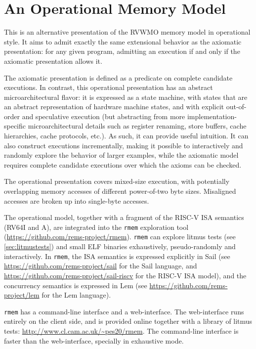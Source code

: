 \section{An Operational Memory Model}
\label{sec:operational}
This is an alternative presentation of the RVWMO memory model in
operational style.
%
It aims to admit exactly the same extensional behavior as the
axiomatic presentation: for any given program, admitting an execution
if and only if the axiomatic presentation allows it.

The axiomatic presentation is defined as a predicate on complete
candidate executions.  In contrast, this operational presentation has
an abstract microarchitectural flavor: it is expressed as a state
machine, with states that are an abstract representation of hardware
machine states, and with explicit out-of-order and speculative
execution
(but abstracting from more implementation-specific microarchitectural
details such as register renaming, store buffers, cache hierarchies, cache protocols, etc.).
As such, it can provide useful intuition.
It can also
construct executions incrementally, making it possible to
interactively and randomly explore the behavior of larger examples,
while the axiomatic model requires complete candidate executions
over which the axioms can be checked.

The operational presentation covers mixed-size execution, with
potentially overlapping memory accesses of different power-of-two byte
sizes.  Misaligned accesses are broken up into single-byte accesses.

The operational model, together with a fragment of the RISC-V ISA
semantics (RV64I and A), are integrated into the {\tt rmem} exploration
tool (\url{https://github.com/rems-project/rmem}).  {\tt rmem} can
explore litmus tests (see \ref{sec:litmustests}) and small ELF
binaries exhaustively,
pseudo-randomly and interactively.  In {\tt rmem}, the ISA semantics
is expressed explicitly in Sail (see
\url{https://github.com/rems-project/sail} for the Sail language, and
\url{https://github.com/rems-project/sail-riscv} for the RISC-V ISA
model), and the concurrency semantics is expressed in Lem (see
\url{https://github.com/rems-project/lem} for the Lem language).

{\tt rmem} has a command-line interface and a web-interface.
The web-interface runs entirely on the client side, and is provided
online together with a library of litmus tests:
\url{http://www.cl.cam.ac.uk/~pes20/rmem}.  The command-line interface
is faster than the web-interface, specially in exhaustive mode.

